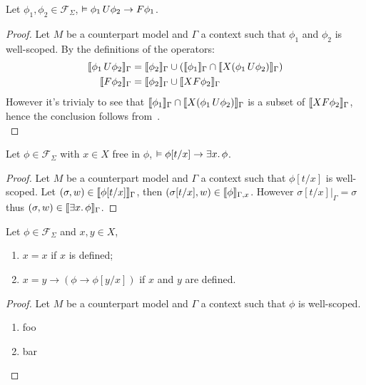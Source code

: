 \begin{lemma}\label{lem:untileventually}
  Let $\phi_1, \phi_2 \in \mathcal{F}_\Sigma$, $\vDash {\phi_1}\,U {\phi_2} \to F{\phi_1}$.
\end{lemma}
\begin{proof}
  Let $M$ be a counterpart model and $\Gamma$ a context such that $\phi_1$ and $\phi_2$ is well-scoped.
  By the definitions of the operators:
  \[
    \begin{split}
      \llbracket {\phi_1}\,U {\phi_2} \rrbracket_{\Gamma} &= \llbracket \phi_2 \rrbracket_{\Gamma} \cup (\llbracket \phi_1 \rrbracket_{\Gamma} \cap
      \llbracket X{({\phi_1}\,U {\phi_2})} \rrbracket_{\Gamma}) \\
      \llbracket F{\phi_2} \rrbracket_{\Gamma} &= \llbracket \phi_2 \rrbracket_{\Gamma} \cup \llbracket X{F{\phi_2}} \rrbracket_{\Gamma} \\
    \end{split}
  \]
  However it's trivialy to see that $\llbracket \phi_1 \rrbracket_{\Gamma} \cap \llbracket X{({\phi_1}\,U {\phi_2})} \rrbracket_{\Gamma}$ is a
  subset of $\llbracket X{F{\phi_2}} \rrbracket_{\Gamma}$, hence the conclusion follows from~. \\
\end{proof}

\begin{lemma}\label{lem:exintro}
  Let $\phi \in \mathcal{F}_\Sigma$ with $x \in X$ free in $\phi$, $\vDash \phi[t/x] \to \exists {x} \ldotp {\phi}$.
\end{lemma}
\begin{proof}
  Let $M$ be a counterpart model and $\Gamma$ a context such that $\phi[t/x]$ is well-scoped.
  Let $(\sigma, w) \in \llbracket \phi[t/x] \rrbracket_{\Gamma}$, then $(\sigma[t/x], w) \in \llbracket \phi \rrbracket_{\Gamma,x}$.
  However $\sigma[t/x]|_\Gamma = \sigma$ thus $(\sigma, w) \in \llbracket \exists {x} \ldotp {\phi} \rrbracket_{\Gamma}$.
\end{proof}

\begin{lemma}\label{lem:equality}
  Let $\phi \in \mathcal{F}_\Sigma$ and $x, y \in X$,
  \begin{enumerate}
    \item $x = x$ if $x$ is defined;
    \item $x = y \to (\phi \to \phi[y/x])$ if $x$ and $y$ are defined.
  \end{enumerate}
\end{lemma}
\begin{proof}
  Let $M$ be a counterpart model and $\Gamma$ a context such that $\phi$ is well-scoped.
  \begin{enumerate}
    \item foo
    \item bar
  \end{enumerate}
\end{proof}

